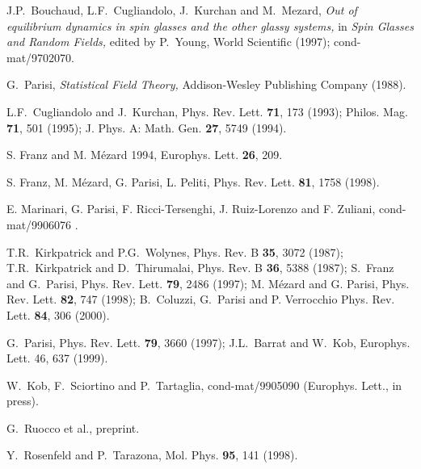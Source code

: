 \begin{references}

  J.P.~Bouchaud, L.F.~Cugliandolo, J.~Kurchan and M.~Mezard,
{\it Out of equilibrium dynamics in spin glasses and the other glassy
systems, } in {\it Spin Glasses and Random Fields, } edited by P.~Young,
World Scientific (1997); cond-mat/9702070.

  G.~Parisi, {\it Statistical Field Theory, } Addison-Wesley
Publishing Company (1988).

  L.F.~Cugliandolo and J.~Kurchan, Phys. Rev. Lett. {\bf 71},
173 (1993); Philos. Mag. {\bf 71}, 501 (1995); J. Phys. A: Math. Gen. {\bf 27},
5749 (1994).

S. Franz and M. M\'ezard 1994, Europhys.  Lett.  {\bf 26}, 209.

S. Franz, M. M\'ezard, G. Parisi, L. Peliti, Phys. Rev. Lett. 
{\bf 81}, 1758 (1998).

 E. Marinari, G. Parisi, F. Ricci-Tersenghi, 
J. Ruiz-Lorenzo and F. Zuliani, cond-mat/9906076 . 

  T.R.~Kirkpatrick and P.G.~Wolynes, Phys. Rev. B {\bf 35},
3072 (1987); T.R.~Kirkpatrick and D.~Thirumalai, Phys. Rev. B {\bf 36}, 5388
(1987); S.~Franz and G.~Parisi, Phys. Rev. Lett. {\bf 79}, 2486 (1997);
M. M\'ezard and G. Parisi, Phys. Rev. Lett. {\bf 82}, 747 (1998);
B.~Coluzzi, G.~Parisi and P. Verrocchio Phys. Rev. Lett. {\bf 84}, 306 (2000).

  G.~Parisi, Phys. Rev. Lett. {\bf 79}, 3660 (1997);
J.L.~Barrat and W.~Kob, Europhys. Lett. 46, 637 (1999).

 W.~Kob, F.~Sciortino and P.~Tartaglia,
 cond-mat/9905090 (Europhys. Lett., in press).

 G.~Ruocco et al., preprint. 

  Y.~Rosenfeld and P.~Tarazona,
Mol. Phys. {\bf 95}, 141 (1998).


\end{references}


